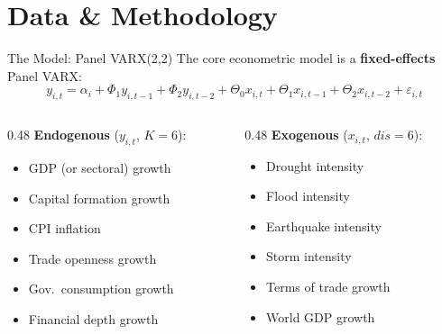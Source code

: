 \documentclass[10pt, aspectratio=169]{beamer}
\begin{document}
\section{Data \& Methodology}

\begin{frame}{The Model: Panel VARX(2,2)}
The core econometric model is a \textbf{fixed-effects} Panel VARX:
\[
y_{i,t} = \alpha_i + \Phi_1 y_{i,t-1} + \Phi_2 y_{i,t-2} + \Theta_0 x_{i,t} + \Theta_1 x_{i,t-1} + \Theta_2 x_{i,t-2} + \varepsilon_{i,t}
\]

\begin{columns}
\hspace{5mm}
\begin{column}{0.48\textwidth}
\textbf{Endogenous} ($y_{i,t}$, $K=6$):
\begin{itemize}
    \item GDP (or sectoral) growth
    \item Capital formation growth
    \item CPI inflation
    \item Trade openness growth
    \item Gov.\ consumption growth
    \item Financial depth growth
\end{itemize}
\end{column}
\begin{column}{0.48\textwidth}
\textbf{Exogenous} ($x_{i,t}$, $dis=6$):
\begin{itemize}
    \item Drought intensity
    \item Flood intensity
    \item Earthquake intensity
    \item Storm intensity
    \item Terms of trade growth
    \item World GDP growth
\end{itemize}
\end{column}
\end{columns}
\end{frame}
\end{document}
